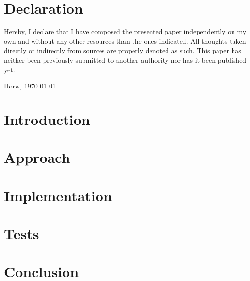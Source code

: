 \documentclass[a4paper, english, 10pt]{report}
\begin{document}
\chapter*{Declaration}
\thispagestyle{empty}
Hereby, I declare that I have composed the presented paper independently on my own and without any other resources than the ones indicated. All thoughts 
taken directly or indirectly from sources are properly denoted as such.
This paper has neither been previously submitted to another authority nor has it been published yet.

\vspace{2cm}
Horw, \today

\begin{abstract}

\end{abstract}
\tableofcontents

\chapter{Introduction}
\label{ch:Introduction}


\chapter{Approach}
\label{ch:Approach}


\chapter{Implementation}
\label{ch:Implementation}


\chapter{Tests}
\label{ch:Tests}


\chapter{Conclusion}
\label{ch:Conclusion}




\begin{appendices}

\end{appendices}
 
\end{document}
